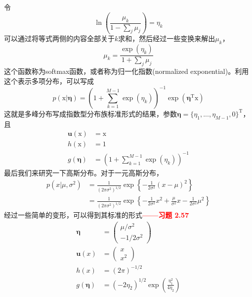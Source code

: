 \documentclass[b5paper]{book}
\numberwithin{equation}{chapter}
\newcommand {\bx} {\boldsymbol{\mathrm{x}}}
\newcommand {\rmT} {\mathrm{T}}
\newcommand {\bfeta} {\boldsymbol{\eta}}
\begin{document}
{	令
	\begin{equation}
		\ln \left(\frac{\mu_k}{1-\sum_j \mu_j}\right) = \eta_k
	\end{equation}
	可以通过将等式两侧的内容全部关于$k$求和，然后经过一些变换来解出$\mu_k$，
	\begin{equation}
		\mu_k = \frac{\exp(\eta_k)}{1+\sum_j \mu_j}
	\end{equation}
	这个函数称为softmax函数，或者称为归一化指数(normalized exponential)。利用这个表示多项分布，可以写成
	\begin{equation}
		p(\bx|\bfeta)=\left(1+\sum_{k=1}^{M-1}\exp(\eta_k)\right)^{-1} \exp(\bfeta^{\rmT}\bx)
	\end{equation}
	这就是多峰分布写成指数型分布族标准形式的结果，参数$\bfeta=\{\eta_1,...,\eta_{M-1},0\}^{\rmT}$，且
	\begin{align}
		\mathbf{u}(\bx)&=\bx \\
		h(\bx)&= 1 \\
		g(\bfeta) &= \left(1+\sum_{k=1}^{M-1}\exp(\eta_k)\right)^{-1}
	\end{align}
	\indent 最后我们来研究一下高斯分布。对于一元高斯分布，
	\begin{align}
		p(x|\mu,\sigma^2) &= \frac{1}{(2\pi \sigma^2)^{1/2}}\exp\left\{-\frac{1}{2\sigma^2}(x-\mu)^2\right\} \\
		&= \frac{1}{(2\pi\sigma^2)^{1/2}}\exp\left\{-\frac{1}{2\sigma^2}x^2+\frac{\mu}{\sigma^2}x - \frac{1}{2\sigma^2}\mu^2\right\}
	\end{align}
	经过一些简单的变形，可以得到其标准的形式\textcolor{red}{\textbf{——习题 2.57}}
	\begin{align}
		\bfeta &= \left(\begin{matrix} \mu/\sigma^2 \\ -1/2\sigma^2 \end{matrix}\right) \\
		\mathbf{u}(x) &= \left(\begin{matrix} x \\ x^2 \end{matrix}\right)\\
		h(x) &= (2\pi)^{-1/2}\\
		g(\bfeta) &= (-2\eta_2)^{1/2} \exp \left(\frac{\eta_1^2}{4\eta_2}\right)
	\end{align}
	}
\end{document}
